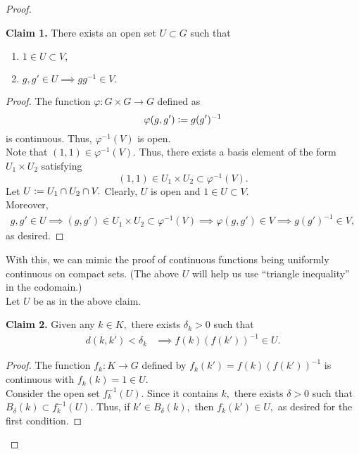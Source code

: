 \documentclass[12pt]{article}
\theoremstyle{definition}
\numberwithin{thm}{section}
\newenvironment{blockquote}
{\begin{mdframed}[skipabove=0pt, skipbelow=0pt, innertopmargin=4pt, innerbottommargin=4pt, bottomline=false,topline=false,rightline=false, linewidth=2pt]}
{\end{mdframed}}
\begin{document}
\begin{proof} \phantom{hi}

	\begin{blockquote}
		\textbf{Claim 1.} There exists an open set $U \subset G$ such that
		\begin{enumerate}
			\item $1 \in U \subset V,$
			\item $g, g' \in U \implies gg^{-1} \in V.$
		\end{enumerate}
		\begin{proof} 
			The function $\varphi:G \times G \to G$ defined as
			\begin{equation*} 
				\varphi(g, g') \vcentcolon= g(g')^{-1}
			\end{equation*}
			is continuous. Thus, $\varphi^{-1}(V)$ is open.\\
			Note that $(1, 1) \in \varphi^{-1}(V).$ Thus, there exists a basis element of the form $U_1 \times U_2$ satisfying
			\begin{equation*} 
				(1, 1) \in U_1 \times U_2 \subset \varphi^{-1}(V).
			\end{equation*}
			Let $U\vcentcolon= U_1 \cap U_2 \cap V.$ Clearly, $U$ is open and $1 \in U \subset V.$ \\
			Moreover,
			\begin{align*} 
				g, g' \in U \implies (g, g') \in U_1 \times U_2 \subset \varphi^{-1}(V) \implies \varphi(g, g') \in V \implies g(g')^{-1} \in V,
			\end{align*}
			as desired.
		\end{proof}
	\end{blockquote}
		With this, we can mimic the proof of continuous functions being uniformly continuous on compact sets. (The above $U$ will help us use ``triangle inequality'' in the codomain.)\\
		Let $U$ be as in the above claim.\\
	\begin{blockquote}
		\textbf{Claim 2.} Given any $k \in K,$ there exists $\delta_k > 0$ such that
		\begin{align*} 
			d(k, k') < \delta_k &\implies f(k)(f(k'))^{-1} \in U.	
		\end{align*}
		\begin{proof} 
			The function $f_k : K \to G$ defined by $f_k(k') = f(k)(f(k'))^{-1}$ is continuous with $f_k(k) = 1 \in U.$\\
			Consider the open set $f_k^{-1}(U).$ Since it contains $k,$ there exists $\delta > 0$ such that $B_\delta(k) \subset f_k^{-1}(U).$ Thus, if $k' \in B_\delta(k),$ then $f_k(k') \in U,$ as desired for the first condition.


\end{proof}
\end{blockquote}
\end{proof}
\end{document}
